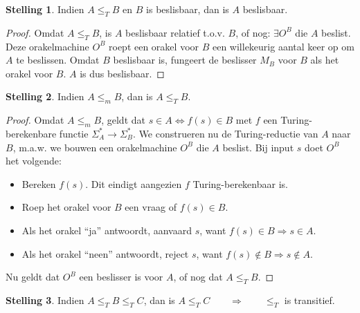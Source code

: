 \documentclass[kulak]{kulakarticle}
\theoremstyle{definition}
\newtheorem*{stelling}{Stelling}
\begin{document}
	\begin{stelling}
		Indien \( A \leq_T B \) en \( B \) is beslisbaar, dan is \( A \) beslisbaar.
	\end{stelling}

	\begin{proof}
		Omdat \( A \leq_T B \), is \(A\) beslisbaar relatief t.o.v. \(B\), of nog: \(\exists O^B\) die \(A\) beslist. Deze orakelmachine \( O^B \) roept een orakel  voor \(B\) een willekeurig aantal keer op om \(A\) te beslissen. Omdat \(B\) beslisbaar is, fungeert de beslisser \(M_B\) voor \(B\) als het orakel voor \(B\). \(A\) is dus beslisbaar.
	\end{proof}

	\begin{stelling}
		Indien \(A \leq_m B\), dan is \(A \leq_T B\).
	\end{stelling}

	\begin{proof}
		Omdat \(A \leq_m B\), geldt dat \(s\in A \Leftrightarrow f(s)\in B\) met \( f \) een Turing-berekenbare functie \(\Sigma_A^*\to\Sigma_B^*\). We construeren nu de Turing-reductie van \(A\) naar \(B\), m.a.w. we bouwen een orakelmachine \(O^B\) die \(A\) beslist. Bij input \(s\) doet \(O^B\) het volgende:
		\begin{itemize}
			\item Bereken \(f(s)\). Dit eindigt aangezien \(f\) Turing-berekenbaar is.
			\item Roep het orakel voor \(B\) een vraag of \(f(s)\in B\).
			\item Als het orakel ``ja'' antwoordt, aanvaard \(s\), want \(f(s)\in B \Rightarrow s\in A\).
			\item Als het orakel ``neen'' antwoordt, reject \(s\), want \(f(s)\notin B \Rightarrow s\notin A\).
		\end{itemize}
		Nu geldt dat \(O^B\) een beslisser is voor \(A\), of nog dat \(A \leq_T B\).
	\end{proof}

	\newpage
	\begin{stelling}
		Indien \(A \leq_T B \leq_T C\), dan is \(A \leq_T C \qquad \Longrightarrow \qquad \leq_T\) is transitief.
	\end{stelling}
\end{document}
